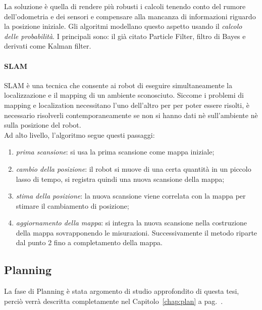 La soluzione è quella di rendere più robusti i calcoli tenendo conto del rumore dell'odometria e dei
sensori e compensare alla mancanza di informazioni riguardo la posizione iniziale. Gli algoritmi
modellano questo aspetto usando il \textit{calcolo delle probabilità}. I principali sono: il già citato
Particle Filter, filtro di Bayes e derivati come Kalman filter.

\paragraph{SLAM}
\label{par:slam}
SLAM è una tecnica che consente ai robot di eseguire simultaneamente la localizzazione e il mapping
di un ambiente sconosciuto. Siccome i problemi di mapping e localization necessitano l'uno dell'altro
per per poter essere risolti, è necessario risolverli contemporaneamente se non si hanno dati
nè sull'ambiente nè sulla posizione del robot.\\
Ad alto livello, l'algoritmo segue questi passaggi:
\begin{enumerate}
	\item \textit{prima scansione}: si usa la prima scansione come mappa iniziale;
	\item \textit{cambio della posizione}: il robot si muove di una certa quantità in un piccolo
	      lasso di tempo, si registra quindi una nuova scansione della mappa;
	\item \textit{stima della posizione}: la nuova scansione viene correlata con la mappa per
	      stimare il cambiamento di posizione;
	\item \textit{aggiornamento della mappa}: si integra la nuova scansione nella costruzione della mappa
	      sovrapponendo le misurazioni. Successivamente il metodo riparte dal punto 2 fino a
		  completamento della mappa.
\end{enumerate}

\subsection{Planning}
La fase di Planning è stata argomento di studio approfondito di questa tesi, perciò verrà descritta
completamente nel Capitolo~\ref{chap:plan} a pag.~\pageref{chap:plan}.


